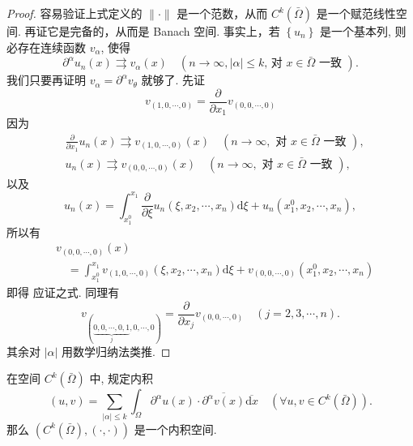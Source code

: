 \documentclass[lang=cn,newtx,10pt,scheme=chinese,thmcnt=chapter]{elegantbook}
\newcommand{\dif}{\mathrm{d}}
\begin{document}
\begin{proof}
容易验证上式定义的 $\|\cdot\|$ 是一个范数，从而 $C^k(\bar{\Omega})$ 是一个赋范线性空间. 再证它是完备的，从而是 Banach 空间. 事实上，若 $\left\{u_n\right\}$ 是一个基本列, 则必存在连续函数 $v_\alpha$, 使得
\begin{equation*}
\partial^\alpha u_n(x) \rightrightarrows v_\alpha(x) \quad(n \rightarrow \infty,|\alpha| \leqslant k \text {, 对 } x \in \bar{\Omega} \text { 一致 }) .
\end{equation*}
我们只要再证明 $v_\alpha=\partial^\alpha v_\theta$ 就够了. 先证
\begin{equation*}
v_{(1,0, \cdots, 0)}=\frac{\partial}{\partial x_1} v_{(0,0, \cdots, 0)}
\end{equation*}
因为
\begin{equation*}
\begin{aligned}
& \frac{\partial}{\partial x_1} u_n(x) \rightrightarrows v_{(1,0, \cdots, 0)}(x) \quad(n \rightarrow \infty, \text { 对 } x \in \bar{\Omega} \text { 一致 }), \\
& u_n(x) \rightrightarrows v_{(0,0, \cdots, 0)}(x) \quad(n \rightarrow \infty, \text { 对 } x \in \bar{\Omega} \text { 一致 }),
\end{aligned}
\end{equation*}
以及
\begin{equation*}
u_n(x)=\int_{x_1^0}^{x_1} \frac{\partial}{\partial \xi} u_n\left(\xi, x_2, \cdots, x_n\right) \dif \xi+u_n\left(x_1^0, x_2, \cdots, x_n\right),
\end{equation*}
所以有
\begin{equation*}
\begin{aligned}
& v_{(0,0, \cdots, 0)}(x) \\
& \quad=\int_{x_1^0}^{x_1} v_{(1,0, \cdots, 0)}\left(\xi, x_2, \cdots, x_n\right) \dif \xi+v_{(0,0, \cdots, 0)}\left(x_1^0, x_2, \cdots, x_n\right)
\end{aligned}
\end{equation*}
即得 应证之式. 同理有
\begin{equation*}
v_{(\underbrace{0,0, \cdots, 0,1}_j,0, \cdots, 0)}=\frac{\partial}{\partial x_j} v_{(0,0, \cdots, 0)} \quad(j=2,3, \cdots, n) .
\end{equation*}
其余对 $|\alpha|$ 用数学归纳法类推.
\end{proof}



\begin{example}
在空间 $C^k(\bar{\Omega})$ 中, 规定内积
\begin{equation*}
(u, v)=\sum_{|\alpha| \leqslant k} \int_{\Omega} \partial^\alpha u(x) \cdot \overline{\partial^\alpha v(x)} \overline{\dif x} \quad\left(\forall u, v \in C^k(\bar{\Omega})\right) .
\end{equation*}
那么 $\left(C^k(\bar{\Omega}),(\cdot, \cdot)\right)$ 是一个内积空间.
\end{example}
\end{document}
